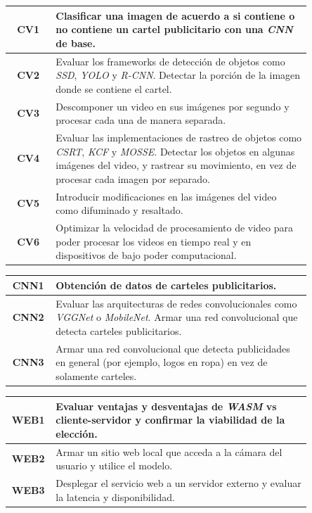 \documentclass[a4paper]{article}
\begin{document}
\begin{center}
\begin{tabular}{c m{0.85\linewidth}} \toprule
    \textbf{CV1} & Clasificar una imagen de acuerdo a si contiene o no contiene un cartel publicitario con una \textit{CNN} de base. \\ \midrule
    \textbf{CV2} & Evaluar los frameworks de detección de objetos como \textit{SSD}, \textit{YOLO} y \textit{R-CNN}. \newline Detectar la porción de la imagen donde se contiene el cartel. \\ \midrule
    \textbf{CV3} & Descomponer un video en sus imágenes por segundo y procesar cada una de manera separada. \\ \midrule
    \textbf{CV4} & Evaluar las implementaciones de rastreo de objetos como \textit{CSRT}, \textit{KCF} y \textit{MOSSE}. \newline Detectar los objetos en algunas imágenes del video, y rastrear su movimiento, en vez de procesar cada imagen por separado. \\ \midrule
    \textbf{CV5} & Introducir modificaciones en las imágenes del video como difuminado y resaltado. \\ \midrule
    \textbf{CV6} & Optimizar la velocidad de procesamiento de video para poder procesar los videos en tiempo real y en dispositivos de bajo poder computacional. \\ \bottomrule
\end{tabular}
\end{center}

\begin{center}
\begin{tabular}{c m{0.85\linewidth}} \toprule
    \textbf{CNN1} & Obtención de datos de carteles publicitarios. \\ \midrule
    \textbf{CNN2} & Evaluar las arquitecturas de redes convolucionales como \textit{VGGNet} o \textit{MobileNet}. \newline Armar una red convolucional que detecta carteles publicitarios. \\ \midrule
    \textbf{CNN3} & Armar una red convolucional que detecta publicidades en general (por ejemplo, logos en ropa) en vez de solamente carteles. \\ \bottomrule
\end{tabular}
\end{center}

\begin{center}
\begin{tabular}{c m{0.85\linewidth}} \toprule
    \textbf{WEB1} & Evaluar ventajas y desventajas de \textit{WASM} vs cliente-servidor y confirmar la viabilidad de la elección. \\ \midrule
    \textbf{WEB2} & Armar un sitio web local que acceda a la cámara del usuario y utilice el modelo. \\ \midrule
    \textbf{WEB3} & Desplegar el servicio web a un servidor externo y evaluar la latencia y disponibilidad. \\ \bottomrule
\end{tabular}
\end{center}
\end{document}
